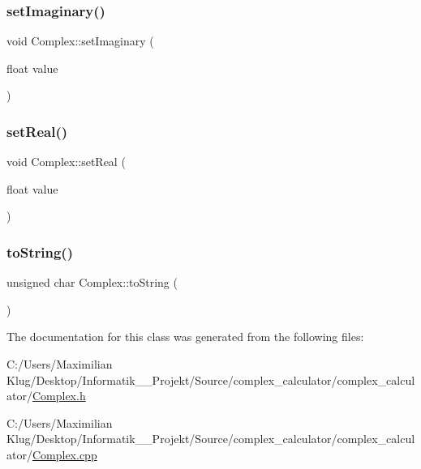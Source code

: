 \subsubsection{\texorpdfstring{set\+Imaginary()}{setImaginary()}}
{\footnotesize\ttfamily void Complex\+::set\+Imaginary (\begin{DoxyParamCaption}\item[{float}]{value }\end{DoxyParamCaption})}

\mbox{\label{class_complex_a5cc1fcf1428a62c4a775fe4625597fa5}} 
\subsubsection{\texorpdfstring{set\+Real()}{setReal()}}
{\footnotesize\ttfamily void Complex\+::set\+Real (\begin{DoxyParamCaption}\item[{float}]{value }\end{DoxyParamCaption})}

\mbox{\label{class_complex_afd4253456f558ed0d1bce5f73af12670}} 
\subsubsection{\texorpdfstring{to\+String()}{toString()}}
{\footnotesize\ttfamily unsigned char Complex\+::to\+String (\begin{DoxyParamCaption}{ }\end{DoxyParamCaption})}



The documentation for this class was generated from the following files\+:\begin{DoxyCompactItemize}
\item 
C\+:/\+Users/\+Maximilian Klug/\+Desktop/\+Informatik\+\_\+\_\+\+Projekt/\+Source/complex\+\_\+calculator/complex\+\_\+calculator/\mbox{\hyperlink{_complex_8h}{Complex.\+h}}\item 
C\+:/\+Users/\+Maximilian Klug/\+Desktop/\+Informatik\+\_\+\_\+\+Projekt/\+Source/complex\+\_\+calculator/complex\+\_\+calculator/\mbox{\hyperlink{_complex_8cpp}{Complex.\+cpp}}\end{DoxyCompactItemize}
